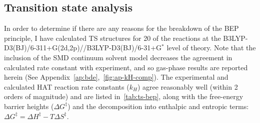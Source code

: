 \begin{doublespace}
\newpage
\section{Transition state analysis}

In order to determine if there are any reasons for the breakdown of the BEP
principle, I have calculated TS structures for 20 of the reactions at the
B3LYP-D3(BJ)/6-311+G(2d,2p)//B3LYP-D3(BJ)/6-31+G$^*$ level of theory. Note that
the inclusion of the SMD continuum solvent model decreases the agreement in
calculated rate constant with experiment, and so gas-phase results are reported
herein (See Appendix~\ref{ap:bde},~\ref{fig:ap-kH-comp}). The experimental and
calculated HAT reaction rate constants ($k_H$) agree reasonably well (within 2
orders of magnitude) and are listed in~\ref{tab:ts-bep}, along with the
free-energy barrier heights ($\Delta G^\ddagger$) and the decomposition into
enthalpic and entropic terms: $\Delta G^\ddagger = \Delta H^\ddagger - T\Delta
S^\ddagger$.


\end{doublespace}
